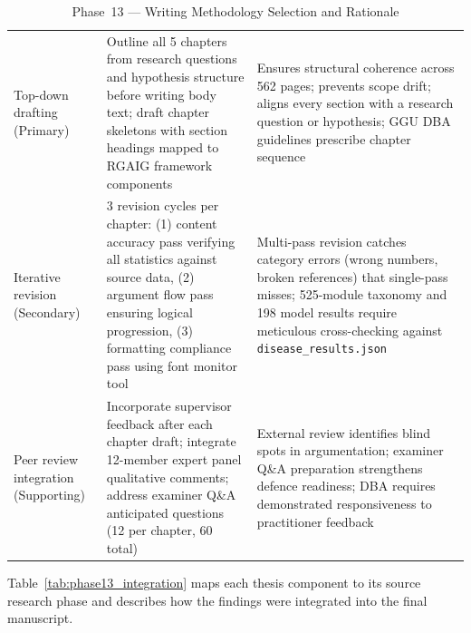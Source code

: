 \begingroup\singlespacing\tablefontsize\tablestripes
\begin{xltabular}{\textwidth}{@{} p{0.18\textwidth} X X @{}}
\caption{Phase~13 --- Writing Methodology Selection and Rationale}
\label{tab:phase13_writing}\\
\toprule
{} &  &  \\
\midrule
\endfirsthead
\endhead
\bottomrule
\endlastfoot
Top-down drafting (Primary)        & Outline all 5 chapters from research questions and hypothesis structure before writing body text; draft chapter skeletons with section headings mapped to RGAIG framework components & Ensures structural coherence across 562 pages; prevents scope drift; aligns every section with a research question or hypothesis; GGU DBA guidelines prescribe chapter sequence \\
\addlinespace
Iterative revision (Secondary)     & 3 revision cycles per chapter: (1) content accuracy pass verifying all statistics against source data, (2) argument flow pass ensuring logical progression, (3) formatting compliance pass using font monitor tool & Multi-pass revision catches category errors (wrong numbers, broken references) that single-pass misses; 525-module taxonomy and 198 model results require meticulous cross-checking against \texttt{disease\_results.json} \\
\addlinespace
Peer review integration (Supporting) & Incorporate supervisor feedback after each chapter draft; integrate 12-member expert panel qualitative comments; address examiner Q\&A anticipated questions (12 per chapter, 60 total) & External review identifies blind spots in argumentation; examiner Q\&A preparation strengthens defence readiness; DBA requires demonstrated responsiveness to practitioner feedback \\
\end{xltabular}
\endgroup

\vspace{1.5em}

Table~\ref{tab:phase13_integration} maps each thesis component to its source research phase and describes how the findings were integrated into the final manuscript.

